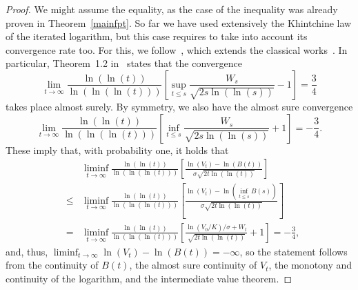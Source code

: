 \documentclass[12pt]{article}
\theoremstyle{definition}
\begin{document}
\begin{proof}
We might assume the equality, as the case of the inequality was already proven in Theorem~\ref{mainfpt}. 
So far we have used extensively the Khintchine law of the iterated logarithm, but this case requires to take into account its convergence rate too. For this, we follow~\cite{KhoshnevisanLevinShi2005}, which extends the classical works~\cite{DarlingErdos1956,Erdos1942LIL}. In particular, Theorem~1.2 in~\cite{KhoshnevisanLevinShi2005} states that the convergence
$$
\lim_{t \to \infty} \frac{\ln(\ln(t))}{\ln(\ln(\ln(t)))} \left[ \sup_{t \le s} \frac{W_s}{\sqrt{2 s \ln(\ln(s))}} -1 \right]=\frac34
$$
takes place almost surely. By symmetry, we also have the almost sure convergence
$$
\lim_{t \to \infty} \frac{\ln(\ln(t))}{\ln(\ln(\ln(t)))} \left[ \inf_{t \le s} \frac{W_s}{\sqrt{2 s \ln(\ln(s))}} +1 \right]=-\frac34.
$$
These imply that, with probability one, it holds that
\begin{eqnarray}\nonumber
&& \liminf_{t \to \infty}
\frac{\ln(\ln(t))}{\ln(\ln(\ln(t)))} \left[
\frac{\ln(V_t)-\ln(B(t))}{\sigma \sqrt{2 t \ln(\ln(t))}} \right] \\ \nonumber
&\le& \liminf_{t \to \infty}
\frac{\ln(\ln(t))}{\ln(\ln(\ln(t)))} \left[
\frac{\ln(V_t)-\ln (\inf_{t \le s} B(s) )}{\sigma \sqrt{2 t \ln(\ln(t))}} \right] \\ \nonumber
&=& \liminf_{t \to \infty} \frac{\ln(\ln(t))}{\ln(\ln(\ln(t)))} \left[ \frac{\ln(V_0/K)/\sigma + W_t}{\sqrt{2t \ln(\ln(t))}} + 1 \right] = -\frac34,
\end{eqnarray}
and, thus, $\liminf_{t \to \infty} \ln(V_t)-\ln(B(t))=-\infty$, so the statement follows from the continuity of $B(t)$, the almost sure continuity of $V_t$, the monotony and continuity of the logarithm, and the intermediate value theorem.
\end{proof}
\end{document}
